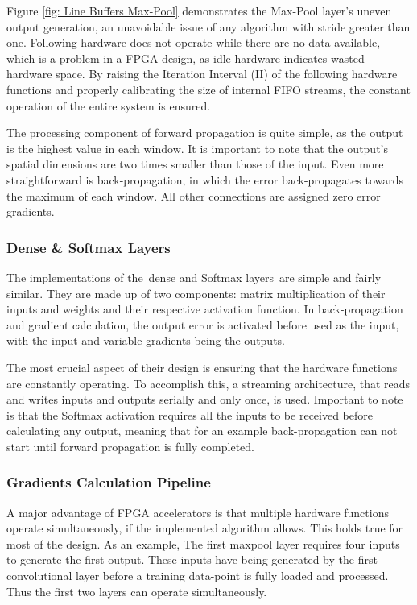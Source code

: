 Figure \ref{fig: Line Buffers Max-Pool} demonstrates the Max-Pool layer's uneven output generation, an unavoidable issue of any algorithm with stride greater than one. Following hardware does not operate while there are no data available, which is a problem in a FPGA design, as idle hardware indicates wasted hardware space. By raising the Iteration Interval (II) of the following hardware functions and properly calibrating the size of internal FIFO streams, the constant operation of the entire system is ensured.

The processing component of forward propagation is quite simple, as the output is the highest value in each window. It is important to note that the output's spatial dimensions are two times smaller than those of the input. Even more straightforward is back-propagation, in which the error back-propagates towards the maximum of each window. All other connections are assigned zero error gradients.

\subsubsection{Dense \& Softmax Layers}
The implementations of the dense and Softmax layers are simple and fairly similar. They are made up of two components: matrix multiplication of their inputs and weights and their respective activation function. In back-propagation and gradient calculation, the output error is activated before used as the input, with the input and variable gradients being the outputs.

The most crucial aspect of their design is ensuring that the hardware functions are constantly operating. To accomplish this, a streaming architecture, that reads and writes inputs and outputs serially and only once, is used. Important to note is that the Softmax activation requires all the inputs to be received before calculating any output, meaning that for an example back-propagation can not start until forward propagation is fully completed.

\subsubsection{Gradients Calculation Pipeline} %
A major advantage of FPGA accelerators is that multiple hardware functions operate simultaneously, if the implemented algorithm allows. This holds true for most of the design. As an example, The first maxpool layer requires four inputs to generate the first output. These inputs have being generated by the first convolutional layer before a training data-point is fully loaded and processed. Thus the first two layers can operate simultaneously. %

